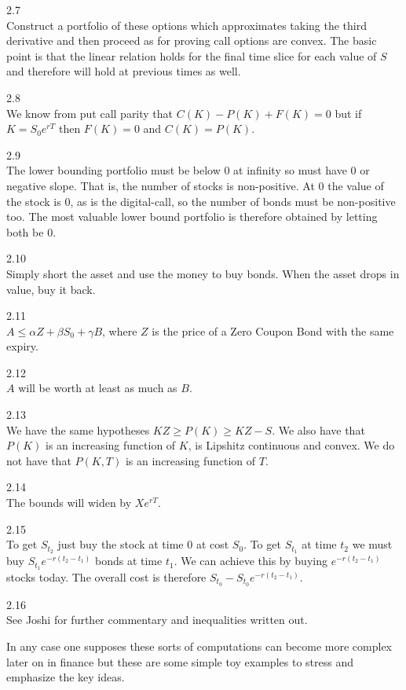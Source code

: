 2.7 \\
Construct a portfolio of these options which approximates taking the third derivative and then proceed as for proving call options are convex. The basic point is that the linear relation holds for the final time slice for each value of $S$ and therefore will hold at previous times as well.

2.8 \\
We know from put call parity that $C(K)-P(K)+F(K)=0$ but if $K = S_0 e^{rT}$ then $F(K)=0$ and $C(K)=P(K)$.

2.9 \\
The lower bounding portfolio must be below $0$ at infinity so must have $0$ or negative slope. That is, the number of stocks is non-positive. At $0$ the value of the stock is $0$, as is the digital-call, so the number of bonds must be non-positive too. The most valuable lower bound portfolio is therefore obtained by letting both be $0$.

2.10 \\
Simply short the asset and use the money to buy bonds. When the asset drops in value, buy it back.

2.11 \\
$\boxed{A \le \alpha Z+ \beta S_0 + \gamma B}$, where $Z$ is the price of a Zero Coupon Bond with the same expiry.

2.12 \\
$A$ will be worth at least as much as $B$.

2.13 \\
We have the same hypotheses $KZ \ge P(K) \ge KZ-S$. We also have that $P(K)$ is an increasing function of $K$, is Lipshitz continuous and convex. We do not have that $P(K,T)$ is an increasing function of $T$.

2.14 \\
The bounds will widen by $Xe^{rT}$.

2.15 \\
To get $S_{t_2}$ just buy the stock at time $0$ at cost $S_0$. To get $S_{t_1}$ at time $t_2$ we must buy $S_{t_1}e^{-r(t_2-t_1)}$ bonds at time $t_1$. We can achieve this by buying $e^{-r(t_2-t_1)}$ stocks today. The overall cost is therefore $S_{t_0}-S_{t_0} e^{-r(t_2-t_1)}$.

2.16 \\
See Joshi for further commentary and inequalities written out.

In any case one supposes these sorts of computations can become more complex later on in finance but these are some simple toy examples to stress and emphasize the key ideas.

